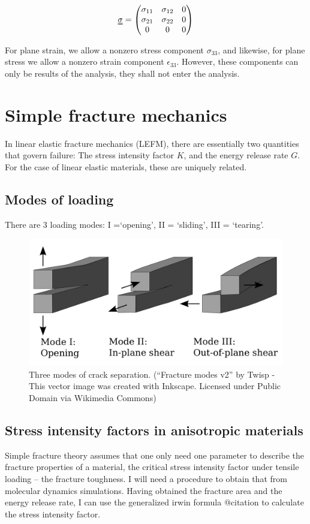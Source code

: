 \begin{equation}
\uuline \sigma = 
\begin{pmatrix}
	\sigma_{11} & \sigma_{12} & 0 \\
	\sigma_{21} & \sigma_{22} & 0 \\
	0 & 0 & 0
\end{pmatrix}
\label{eq:plane_stress}
\end{equation}

For plane strain, we allow a nonzero stress component $\sigma_{33}$, and likewise, for plane stress we allow a nonzero strain component $\epsilon_{33}$. However, these components can only be results of the analysis, they shall not enter the analysis. 


\section{Simple fracture mechanics}
In linear elastic fracture mechanics (LEFM), there are essentially two quantities that govern failure: The stress intensity factor $K$, and the energy release rate $G$. For the case of linear elastic materials, these are uniquely related.

\subsection{Modes of loading}
There are 3 loading modes: I =`opening', II = `sliding', III = `tearing'. 

\begin{figure}
\includegraphics[width=\textwidth]{../figures/thesis/Fracture_modes_v2.pdf}
\caption{Three modes of crack separation. (``Fracture modes v2'' by Twisp - This vector image was created with Inkscape. Licensed under Public Domain via Wikimedia Commons)}
\end{figure}

\subsection{Stress intensity factors in anisotropic materials}
Simple fracture theory assumes that one only need one parameter to describe the fracture properties of a material, the critical stress intensity factor under tensile loading -- the fracture toughness. I will need a procedure to obtain that from molecular dynamics simulations. Having obtained the fracture area and the energy release rate, I can use the generalized irwin formula @citation to calculate the stress intensity factor. 

